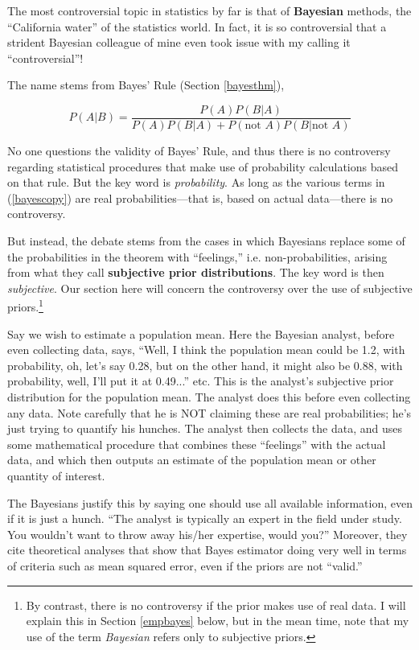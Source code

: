\bigskip

The most controversial topic in statistics by far is that of {\bf
Bayesian} methods, the ``California water'' of the statistics world.  In
fact, it is so controversial that a strident Bayesian colleague of mine
even took issue with my calling it ``controversial''! 

The name stems from Bayes' Rule (Section \ref{bayesthm}),

\begin{equation}
\label{bayescopy}
P(A|B) = \frac{P(A) P(B|A)}{P(A) P(B|A) + P(\textrm{not }A)
P(B|\textrm{not } A)}
\end{equation}

No one questions the validity of Bayes' Rule, and thus there is no
controversy regarding statistical procedures that make use of
probability calculations based on that rule.  But the key word is {\it
probability}.  As long as the various terms in (\ref{bayescopy}) are
real probabilities---that is, based on actual data---there is no
controversy.  

But instead, the debate stems from the cases in which Bayesians replace
some of the probabilities in the theorem with ``feelings,'' i.e.
non-probabilities, arising from what they call {\bf subjective prior
distributions}.  The key word is then {\it subjective}.  Our section
here will concern the controversy over the use of subjective
priors.\footnote{By contrast, there is no controversy if the prior makes
use of real data.  I will explain this in  Section \ref{empbayes} below,
but in the mean time, note that my use of the term {\it Bayesian} refers
only to subjective priors.}

Say we wish to estimate a population mean.  Here the Bayesian analyst,
before even collecting data, says, ``Well, I think the population mean
could be 1.2, with probability, oh, let's say 0.28, but on the other
hand, it might also be 0.88, with probability, well, I'll put it at
0.49...'' etc.  This is the analyst's subjective prior distribution for
the population mean.  The analyst does this before even collecting any
data.  Note carefully that he is NOT claiming these are real
probabilities; he's just trying to quantify his hunches.  The analyst
then collects the data, and uses some mathematical procedure that
combines these ``feelings'' with the actual data, and which then outputs
an estimate of the population mean or other quantity of interest. 

The Bayesians justify this by saying one should use all available
information, even if it is just a hunch.  ``The analyst is typically an
expert in the field under study.  You wouldn't want to throw away
his/her expertise, would you?''  Moreover, they cite theoretical
analyses that show that Bayes estimator doing very well in terms of
criteria such as mean squared error, even if the priors are not
``valid.''


